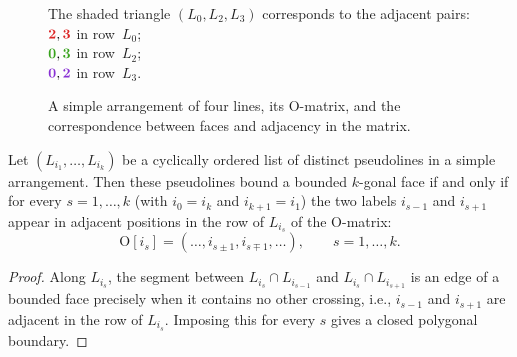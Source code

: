 \begin{figure}[ht]
\begin{minipage}[t]{0.32\linewidth}
\end{minipage}
\hfill
\begin{minipage}[t]{0.32\linewidth}
\raggedright
\setlength{\baselineskip}{1.22\baselineskip}
The shaded triangle $(L_0,L_2,L_3)$ corresponds to
the adjacent pairs:\\
$\edgeacolor{2},\edgeacolor{3}$ in row~$L_0$;\;\\
$\edgebcolor{0},\edgebcolor{3}$ in row~$L_2$;\;\\
$\edgeccolor{0},\edgeccolor{2}$ in row~$L_3$.
\end{minipage}
\caption{A simple arrangement of four lines, its $\mathrm{O}$-matrix, and the
correspondence between faces and adjacency in the matrix.}
\label{fig:omatrix-example}
\end{figure}

\begin{lemma}\label{lem:face-criterion}
Let $(L_{i_1},\dots,L_{i_k})$ be a cyclically ordered list of distinct
pseudolines in a simple arrangement. Then
these pseudolines bound a bounded $k$-gonal face if and only if for every
$s=1,\dots,k$ (with $i_0=i_k$ and $i_{k+1}=i_1$)
the two labels $i_{s-1}$ and $i_{s+1}$ appear in adjacent positions in the row
of $L_{i_s}$ of the $\mathrm{O}$-matrix:
$$
\mathrm{O}[i_s] = (\dots, i_{s\pm1}, i_{s\mp1}, \dots),
\qquad s=1,\dots,k.
$$
\end{lemma}

\begin{proof}
Along $L_{i_s}$, the segment between $L_{i_s}\cap L_{i_{s-1}}$ and
$L_{i_s}\cap L_{i_{s+1}}$ is an edge of a bounded face precisely when it
contains no other crossing, i.e., $i_{s-1}$ and $i_{s+1}$ are adjacent in the
row of $L_{i_s}$. Imposing this for every $s$ gives a closed polygonal
boundary.
\end{proof}
